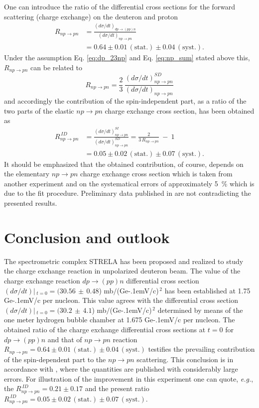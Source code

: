 \documentclass[twocolumn,epjc3]{svjour3}
\newcommand{\np}     {\ensuremath{np \rightarrow pn}\xspace}
\newcommand{\dpchex} {\ensuremath{dp \rightarrow (pp)n}\xspace}
\newcommand{\GeVc}   {Ge\kern-.1emV/c\xspace}
\begin{document}
One can introduce the ratio of the differential cross sections for the forward
scattering (charge exchange) on the deuteron and proton
\begin{equation}
  \begin{split}
    R_{\np} &= \frac{(d\sigma/dt)_{\dpchex}}{(d\sigma/dt)_{\np}} \\
    &= 0.64 \pm 0.01\,\mathrm{(stat.)} \pm 0.04\,\mathrm{(syst.)}.
    \label{eq:rnp}
  \end{split}
\end{equation}
Under the assumption Eq. \eqref{eq:dp_23np} and Eq. \eqref{eq:np_sum} stated
above this, $R_{\np}$ can be related to
\begin{equation}
  R_{\np} = \frac{2}{3}\,\frac{(d\sigma/dt)^{SD}_{\np}}{(d\sigma/dt)_{\np}}
\end{equation}
and accordingly the contribution of the spin-independent part, as a ratio of the
two parts of the elastic \np charge exchange cross section, has been obtained as
\begin{equation}
  \begin{split}
    R^{\,ID}_{\np} &= \frac{(d\sigma/dt)^{SI}_{\np}}{(d\sigma/dt)^{SD}_{\np}}
    = \frac{2}{3\,R_{\np}} \ - \ 1 \\
    &= 0.05 \pm 0.02\,\mathrm{(stat.)} \pm 0.07\,\mathrm{(syst.)}.
    \label{eq:rid}
  \end{split}
\end{equation}
It should be emphasized that the obtained contribution, of course, depends on
the elementary \np charge exchange cross section which is taken from another
experiment and on the systematical errors of approximately 5~\% which is due to
the fit procedure. Preliminary data published in \cite{bas14,bas16} are not
contradicting the presented results.

\section{Conclusion and outlook}
The spectrometric complex STRELA has been proposed and realized to study the
charge exchange reaction in unpola\-rized deuteron beam. The value of the charge
exchange reaction \dpchex differential cross section
$(d\sigma/dt)|\,_{t=0}=(30.56\,\pm\,0.48$) mb$/$(\GeVc)$^{\,2}$ has been
established at 1.75 \GeVc per nucleon. This value agrees with the differential
cross section $(d\sigma/dt)|\,_{t=0}=(30.2\,\pm\,4.1$) mb$/$(\GeVc)$^{\,2}$
determined by means of the one meter hydrogen bubble chamber at 1.675 \GeVc per
nucleon. The obtained ratio of the charge exchange differential cross sections
at $t=0$ for \dpchex and that of \np reaction
$R_{\np} = 0.64 \pm 0.01\,\mathrm{(stat.)} \pm 0.04\,\mathrm{(syst.)}$ testifies
the prevailing contribution of the spin-dependent part to the \np scattering.
This conclusion is in accordance with \cite{gla08}, where the quantities are
published with considerably large errors.
For illustration of the improvement in this experiment one can quote,
\textit{e.g.}, the $R^{\,ID}_{\np} = 0.21 \pm 0.17$ \cite{gla08} and the present
ratio
$R^{\,ID}_{\np} = 0.05 \pm 0.02\,\mathrm{(stat.)} \pm 0.07\,\mathrm{(syst.)}$.
\end{document}
